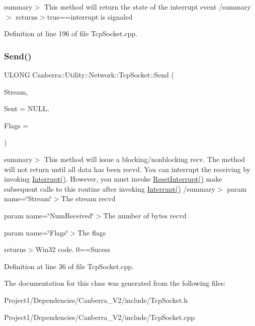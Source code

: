 summary$>$ This method will return the state of the interrupt event /summary$>$ returns$>$true==interrupt is signaled

Definition at line 196 of file Tcp\+Socket.\+cpp.

\mbox{\label{class_canberra_1_1_utility_1_1_network_1_1_tcp_socket_abcf2b78614e6cb9853ae90c6b4d4be7c_abcf2b78614e6cb9853ae90c6b4d4be7c}} 
\subsubsection{\texorpdfstring{Send()}{Send()}}
{\footnotesize\ttfamily U\+L\+O\+NG Canberra\+::\+Utility\+::\+Network\+::\+Tcp\+Socket\+::\+Send (\begin{DoxyParamCaption}\item[{\hyperlink{class_canberra_1_1_utility_1_1_core_1_1_byte_stream}{Canberra\+::\+Utility\+::\+Core\+::\+Byte\+Stream} \&}]{Stream,  }\item[{U\+L\+O\+NG $\ast$}]{Sent = {\ttfamily NULL},  }\item[{L\+O\+NG}]{Flags = {} }\end{DoxyParamCaption})}

summary$>$ This method will issue a blocking/nonblocking recv. The method will not return until all data has been recv\textquotesingle{}d. You can interrupt the receiving by invoking \hyperlink{class_canberra_1_1_utility_1_1_network_1_1_tcp_socket_ad0329ac027d48c11de687d8bad972c0d_ad0329ac027d48c11de687d8bad972c0d}{Interrupt()}. However, you must invoke \hyperlink{class_canberra_1_1_utility_1_1_network_1_1_tcp_socket_a558fbc89e7a2682ef3370bf8d3020764_a558fbc89e7a2682ef3370bf8d3020764}{Reset\+Interrupt()} make subsequent calls to this routine after invoking \hyperlink{class_canberra_1_1_utility_1_1_network_1_1_tcp_socket_ad0329ac027d48c11de687d8bad972c0d_ad0329ac027d48c11de687d8bad972c0d}{Interrupt()} /summary$>$ param name=\char`\"{}\+Stream\char`\"{}$>$The stream recv\textquotesingle{}d

param name=\char`\"{}\+Num\+Received\char`\"{}$>$The number of bytes recv\textquotesingle{}d

param name=\char`\"{}\+Flags\char`\"{}$>$The flags

returns$>$Win32 code. 0==Sucess

Definition at line 36 of file Tcp\+Socket.\+cpp.



The documentation for this class was generated from the following files\+:\begin{DoxyCompactItemize}
\item 
Project1/\+Dependencies/\+Canberra\+\_\+\+V2/include/Tcp\+Socket.\+h\item 
Project1/\+Dependencies/\+Canberra\+\_\+\+V2/include/Tcp\+Socket.\+cpp\end{DoxyCompactItemize}
